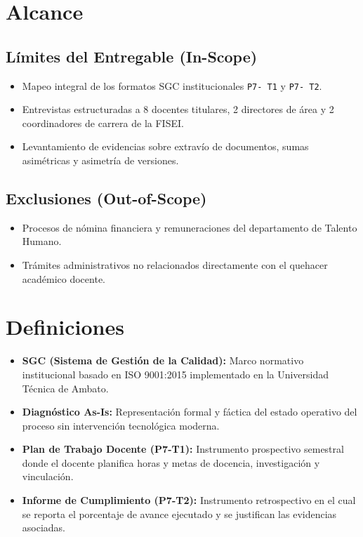 \documentclass[12pt,a4paper]{article}
\begin{document}
\section{Alcance}
\subsection{Límites del Entregable (In-Scope)}
\begin{itemize}[leftmargin=1.5em, itemsep=2pt]
    \item Mapeo integral de los formatos SGC institucionales \texttt{P7- T1} y \texttt{P7- T2}.
    \item Entrevistas estructuradas a 8 docentes titulares, 2 directores de área y 2 coordinadores de carrera de la FISEI.
    \item Levantamiento de evidencias sobre extravío de documentos, sumas asimétricas y asimetría de versiones.
\end{itemize}
\subsection{Exclusiones (Out-of-Scope)}
\begin{itemize}[leftmargin=1.5em, itemsep=2pt]
    \item Procesos de nómina financiera y remuneraciones del departamento de Talento Humano.
    \item Trámites administrativos no relacionados directamente con el quehacer académico docente.
\end{itemize}

\section{Definiciones}
\begin{itemize}[leftmargin=1.5em, itemsep=2pt]
    \item \textbf{SGC (Sistema de Gestión de la Calidad):} Marco normativo institucional basado en ISO 9001:2015 implementado en la Universidad Técnica de Ambato.
    \item \textbf{Diagnóstico As-Is:} Representación formal y fáctica del estado operativo del proceso sin intervención tecnológica moderna.
    \item \textbf{Plan de Trabajo Docente (P7-T1):} Instrumento prospectivo semestral donde el docente planifica horas y metas de docencia, investigación y vinculación.
    \item \textbf{Informe de Cumplimiento (P7-T2):} Instrumento retrospectivo en el cual se reporta el porcentaje de avance ejecutado y se justifican las evidencias asociadas.
\end{itemize}
\end{document}
